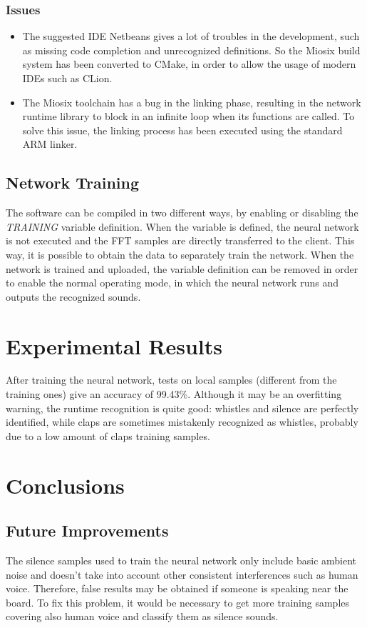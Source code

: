 \documentclass[12pt]{article}
\begin{document}
\subsubsection{Issues}
\begin{itemize}
    \item The suggested IDE Netbeans gives a lot of troubles in the development, such as missing code completion and unrecognized definitions. So the Miosix build system has been converted to CMake, in order to allow the usage of modern IDEs such as CLion.
    \item The Miosix toolchain has a bug in the linking phase, resulting in the network runtime library to block in an infinite loop when its functions are called. To solve this issue, the linking process has been executed using the standard ARM linker.
\end{itemize}

\subsection{Network Training}
The software can be compiled in two different ways, by enabling or disabling the \textit{TRAINING} variable definition. When the variable is defined, the neural network is not executed and the FFT samples are directly transferred to the client. This way, it is possible to obtain the data to separately train the network. When the network is trained and uploaded, the variable definition can be removed in order to enable the normal operating mode, in which the neural network runs and outputs the recognized sounds.

\section{Experimental Results}
After training the neural network, tests on local samples (different from the training ones) give an accuracy of 99.43\%. Although it may be an overfitting warning, the runtime recognition is quite good: whistles and silence are perfectly identified, while claps are sometimes mistakenly recognized as whistles, probably due to a low amount of claps training samples.\\

\section{Conclusions}

\subsection{Future Improvements}
The silence samples used to train the neural network only include basic ambient noise and doesn't take into account other consistent interferences such as human voice. Therefore, false results may be obtained if someone is speaking near the board. To fix this problem, it would be necessary to get more training samples covering also human voice and classify them as silence sounds.
\end{document}
